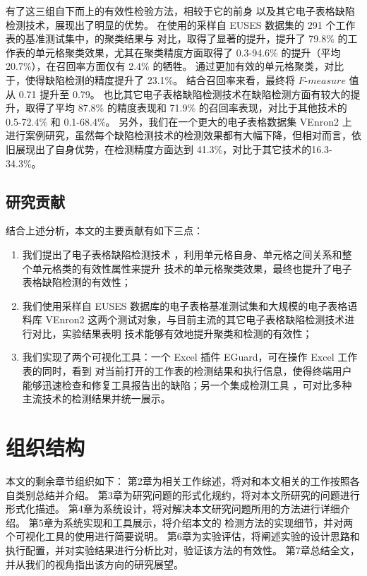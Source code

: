 有了这三组自下而上的有效性检验方法，\wa 相较于它的前身 \cu 以及其它电子表格缺陷检测技术，展现出了明显的优势。
在\cu 使用的采样自 EUSES \cite{fisher2005euses} 数据集的 291 个工作表的基准测试集中，\wa 的聚类结果与 \cu 对比，取得了显著的提升，提升了 79.8\% 的工作表的单元格聚类效果，尤其在聚类精度方面取得了 0.3-94.6\% 的提升（平均 20.7\%），在召回率方面仅有 2.4\% 的牺牲。
\wa 通过更加有效的单元格聚类，对比于\cu，使得缺陷检测的精度提升了 23.1\%。
结合召回率来看，最终将 $F\text{-}measure$ 值从 0.71 提升至 0.79。
\wa 也比其它电子表格缺陷检测技术在缺陷检测方面有较大的提升，取得了平均 87.8\% 的精度表现和 71.9\% 的召回率表现，对比于其他技术的 0.5-72.4\% 和 0.1-68.4\%。
另外，我们在一个更大的电子表格数据集 VEnron2 \cite{xu2017spreadcluster} 上进行案例研究，虽然每个缺陷检测技术的检测效果都有大幅下降，但相对而言，\wa 依旧展现出了自身优势，在检测精度方面达到 41.3\%，对比于其它技术的16.3-34.3\%。

\subsection{研究贡献}
结合上述分析，本文的主要贡献有如下三点：
\begin{enumerate}
    \item 我们提出了电子表格缺陷检测技术 \wa ，利用单元格自身、单元格之间关系和整个单元格类的有效性属性来提升 \cu 技术的单元格聚类效果，最终也提升了电子表格缺陷检测的有效性；
    \item 我们使用采样自 EUSES 数据库的电子表格基准测试集和大规模的电子表格语料库 VEnron2 这两个测试对象，与目前主流的其它电子表格缺陷检测技术进行对比，实验结果表明 \wa 技术能够有效地提升聚类和检测的有效性；
    \item 我们实现了两个可视化工具：一个 Excel 插件 EGuard，可在操作 Excel 工作表的同时，看到 \wa 对当前打开的工作表的检测结果和执行信息，使得终端用户能够迅速检查和修复工具报告出的缺陷；另一个集成检测工具 \sg ，可对比多种主流技术的检测结果并统一展示。
\end{enumerate}


\section{组织结构}
本文的剩余章节组织如下：
第2章为相关工作综述，将对和本文相关的工作按照各自类别总结并介绍。
第3章为研究问题的形式化规约，将对本文所研究的问题进行形式化描述。
第4章为系统设计，将对解决本文研究问题所用的方法进行详细介绍。
第5章为系统实现和工具展示，将介绍本文的 \wa 检测方法的实现细节，并对两个可视化工具的使用进行简要说明。
第6章为实验评估，将阐述实验的设计思路和执行配置，并对实验结果进行分析比对，验证该方法的有效性。
第7章总结全文，并从我们的视角指出该方向的研究展望。
